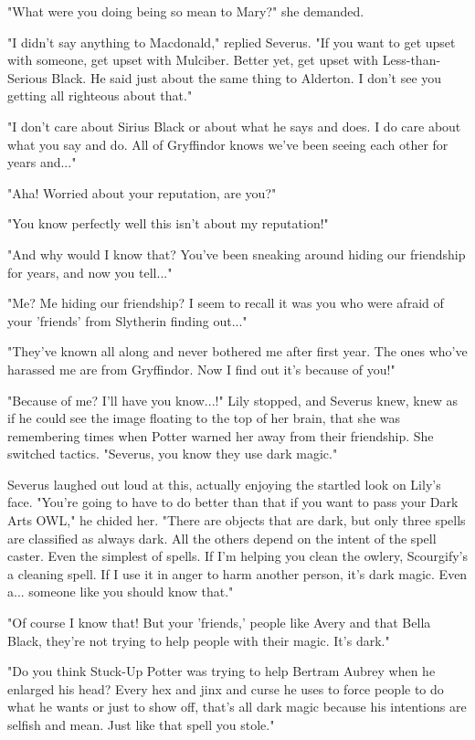 \documentclass[a4paper,11pt]{article}
\begin{document}
"What were you doing being so mean to Mary?" she demanded.

"I didn't say anything to Macdonald," replied Severus. "If you want to get upset with someone, get upset with Mulciber. Better yet, get upset with Less-than-Serious Black. He said just about the same thing to Alderton. I don't see you getting all righteous about that."

"I don't care about Sirius Black or about what he says and does. I do care about what you say and do. All of Gryffindor knows we've been seeing each other for years and..."

"Aha! Worried about your reputation, are you?"

"You know perfectly well this isn't about my reputation!"

"And why would I know that? You've been sneaking around hiding our friendship for years, and now you tell..."

"Me? Me hiding our friendship? I seem to recall it was you who were afraid of your 'friends' from Slytherin finding out..."

"They've known all along and never bothered me after first year. The ones who've harassed me are from Gryffindor. Now I find out it's because of you!"

"Because of me? I'll have you know...!" Lily stopped, and Severus knew, knew as if he could see the image floating to the top of her brain, that she was remembering times when Potter warned her away from their friendship. She switched tactics. "Severus, you know they use dark magic."

Severus laughed out loud at this, actually enjoying the startled look on Lily's face. "You're going to have to do better than that if you want to pass your Dark Arts OWL," he chided her. "There are objects that are dark, but only three spells are classified as always dark. All the others depend on the intent of the spell caster. Even the simplest of spells. If I'm helping you clean the owlery, Scourgify's a cleaning spell. If I use it in anger to harm another person, it's dark magic. Even a... someone like you should know that."

"Of course I know that! But your 'friends,' people like Avery and that Bella Black, they're not trying to help people with their magic. It's dark."

"Do you think Stuck-Up Potter was trying to help Bertram Aubrey when he enlarged his head? Every hex and jinx and curse he uses to force people to do what he wants or just to show off, that's all dark magic because his intentions are selfish and mean. Just like that spell you stole."
\end{document}
